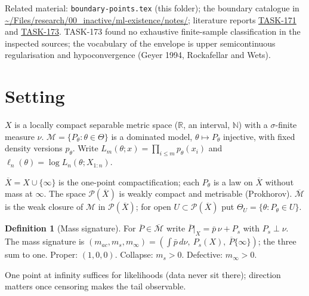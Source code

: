 \documentclass[11pt]{article}
\newcommand{\cM}{\mathcal M}
\newcommand{\bM}{\overline{\mathcal M}}
\newcommand{\bX}{\overline{X}}
\newcommand{\bP}{\overline P}
\newcommand{\cP}{\mathcal P}
\theoremstyle{definition}
\newtheorem{definition}[theorem]{Definition}
\theoremstyle{remark}
\begin{document}
Related material: \texttt{boundary-points.tex} (this folder); the boundary
catalogue in \url{~/Files/research/00_inactive/ml-existence/notes/};
literature reports
\href{evaluations/2026-11-10-defective-limit-lit-report.md}{TASK-171} and
\href{evaluations/2026-11-10-relaxed-likelihood-lit-report.md}{TASK-173}.
TASK-173 found no exhaustive finite-sample classification in the inspected
sources; the vocabulary of the envelope is upper semicontinuous
regularisation and hypoconvergence (Geyer 1994, Rockafellar and Wets).

\section{Setting}\label{sec:setting}
$X$ is a locally compact separable metric space ($\mathbb R$, an interval,
$\mathbb N$) with a $\sigma$-finite measure $\nu$.
$\cM=\{P_\theta:\theta\in\Theta\}$ is a dominated model, $\theta\mapsto
P_\theta$ injective, with fixed density versions $p_\theta$. Write
$L_m(\theta;x)=\prod_{i\le m}p_\theta(x_i)$ and
$\ell_n(\theta)=\log L_n(\theta;X_{1:n})$.

$\bX=X\cup\{\infty\}$ is the one-point compactification; each $P_\theta$ is
a law on $\bX$ without mass at $\infty$. The space $\cP(\bX)$ is weakly compact
and metrisable (Prokhorov). $\bM$ is the weak closure of $\cM$ in
$\cP(\bX)$; for open $U\subset\cP(\bX)$ put $\Theta_U=\{\theta:P_\theta\in U\}$.

\begin{definition}[Mass signature]
For $\bP\in\bM$ write $\bP|_X=\bar p\,\nu+P_s$ with $P_s\perp\nu$. The mass
signature is
$(m_{ac},m_s,m_\infty)=(\int\bar p\,d\nu,\ P_s(X),\ \bP\{\infty\})$; the
three sum to one. Proper: $(1,0,0)$. Collapse: $m_s>0$. Defective:
$m_\infty>0$.
\end{definition}
One point at infinity suffices for likelihoods (data never sit there);
direction matters once censoring makes the tail observable.
\end{document}

